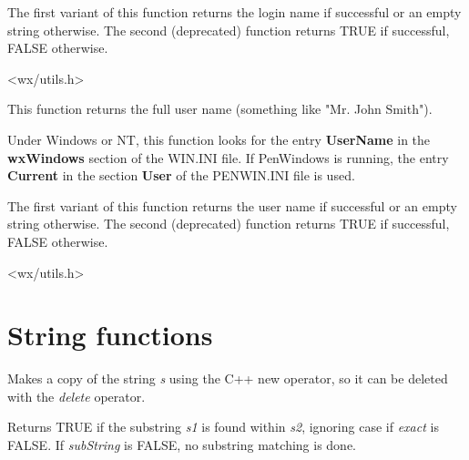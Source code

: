 The first variant of this function returns the login name if successful or an
empty string otherwise. The second (deprecated) function returns TRUE
if successful, FALSE otherwise.




<wx/utils.h>

\label{wxgetusername}



This function returns the full user name (something like "Mr. John Smith").

Under Windows or NT, this function looks for the entry {\bf UserName}\rtfsp
in the {\bf wxWindows} section of the WIN.INI file. If PenWindows
is running, the entry {\bf Current} in the section {\bf User} of
the PENWIN.INI file is used.

The first variant of this function returns the user name if successful or an
empty string otherwise. The second (deprecated) function returns TRUE
if successful, FALSE otherwise.




<wx/utils.h>

\section{String functions}



Makes a copy of the string {\it s} using the C++ new operator, so it can be
deleted with the {\it delete} operator.



Returns TRUE if the substring {\it s1} is found within {\it s2},
ignoring case if {\it exact} is FALSE. If {\it subString} is FALSE,
no substring matching is done.

